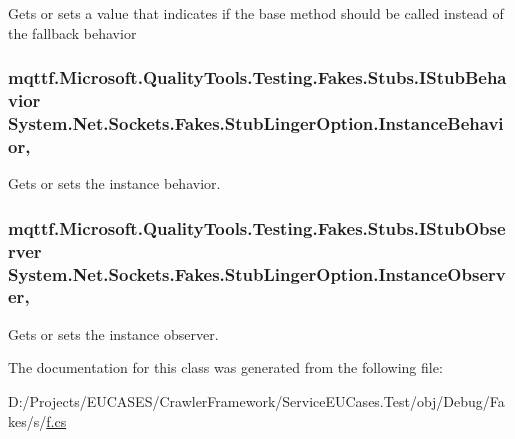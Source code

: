 Gets or sets a value that indicates if the base method should be called instead of the fallback behavior

\hypertarget{class_system_1_1_net_1_1_sockets_1_1_fakes_1_1_stub_linger_option_a7c841336833d1a35eb82613a2bcc906b}{
\subsubsection[{Instance\-Behavior}]{\setlength{\rightskip}{0pt plus 5cm}mqttf.\-Microsoft.\-Quality\-Tools.\-Testing.\-Fakes.\-Stubs.\-I\-Stub\-Behavior System.\-Net.\-Sockets.\-Fakes.\-Stub\-Linger\-Option.\-Instance\-Behavior\hspace{0.3cm}{\ttfamily [get]}, {\ttfamily [set]}}}\label{class_system_1_1_net_1_1_sockets_1_1_fakes_1_1_stub_linger_option_a7c841336833d1a35eb82613a2bcc906b}


Gets or sets the instance behavior.

\hypertarget{class_system_1_1_net_1_1_sockets_1_1_fakes_1_1_stub_linger_option_aa0a93a49803db9286822bd859ae60c2f}{
\subsubsection[{Instance\-Observer}]{\setlength{\rightskip}{0pt plus 5cm}mqttf.\-Microsoft.\-Quality\-Tools.\-Testing.\-Fakes.\-Stubs.\-I\-Stub\-Observer System.\-Net.\-Sockets.\-Fakes.\-Stub\-Linger\-Option.\-Instance\-Observer\hspace{0.3cm}{\ttfamily [get]}, {\ttfamily [set]}}}\label{class_system_1_1_net_1_1_sockets_1_1_fakes_1_1_stub_linger_option_aa0a93a49803db9286822bd859ae60c2f}


Gets or sets the instance observer.



The documentation for this class was generated from the following file\-:\begin{DoxyCompactItemize}
\item 
D\-:/\-Projects/\-E\-U\-C\-A\-S\-E\-S/\-Crawler\-Framework/\-Service\-E\-U\-Cases.\-Test/obj/\-Debug/\-Fakes/s/\hyperlink{s_2f_8cs}{f.\-cs}\end{DoxyCompactItemize}
